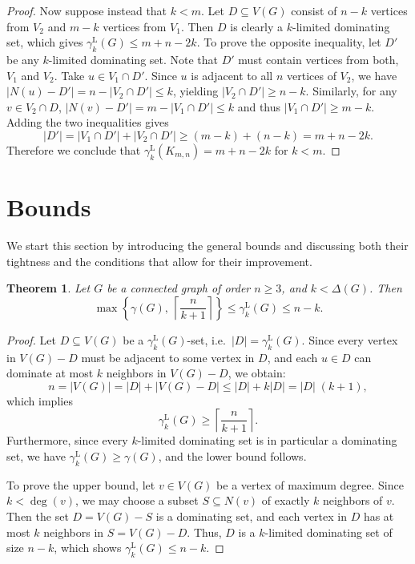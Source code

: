 \documentclass[11pt]{article}
\newtheorem{theorem}{Theorem}
\newcommand{\gammakL}{\gamma_k^{\mathrm L}}
\begin{document}
\begin{proof}
Now suppose instead that $k < m$. Let $D \subseteq V(G)$ consist of $n-k$ vertices from $V_2$ and $m-k$ vertices from $V_1$. Then $D$ is clearly a $k$-limited dominating set, which gives $\gammakL(G) \leq  m+n-2k$.
To prove the opposite inequality, let $D'$ be any $k$-limited dominating set. Note that $D'$ must contain vertices from both, $V_1$ and $V_2$.
Take $u\in V_1\cap D'$. Since $u$ is adjacent to all $n$ vertices of $V_2$, we have
$|N(u)-D'|=n-|V_2\cap D'|\leq k$, yielding $|V_2\cap D'|\geq n-k$.
Similarly, for any $v\in V_2\cap D$,
$|N(v)-D'|=m-|V_1\cap D'|\leq k$ and thus $|V_1\cap D'| \geq m-k$. 
Adding the two inequalities gives
$$|D'|=|V_1\cap D'|+|V_2\cap D'| \geq (m-k)+(n-k)=m+n-2k.$$
Therefore we conclude that $\gamma_k^{\mathrm L}(K_{m,n})=m+n-2k$ for $k<m$.
\end{proof}






\section{Bounds}

We start this section by introducing the general bounds and discussing both their tightness and the conditions that allow for their improvement.

\begin{theorem} 
\label{bounds}
Let $G$ be a connected graph of order $n\geq 3$, and $k < \Delta(G)$. Then
$$
\max\left\{\gamma(G),\ \left\lceil \frac{n}{k+1} \right\rceil\right\} 
\leq \gammakL(G)  \leq 
n-k.
$$
\end{theorem}

\begin{proof}
Let $D \subseteq V(G)$ be a $\gammakL(G)$-set, i.e.~$|D| = \gammakL(G)$. Since every vertex in $V(G) - D$ must be adjacent to some vertex in $D$, and each $u \in D$ can dominate at most $k$ neighbors in $V(G) - D$, we obtain:
$$
n = |V(G)| = |D| + |V(G) - D| \leq |D| + k|D| = |D|\;(k+1),
$$
which implies
$$
\gammakL(G) \geq \left\lceil \frac{n}{k+1} \right\rceil.
$$
Furthermore, since every $k$-limited dominating set is in particular a dominating set, we have $\gammakL(G) \geq \gamma(G)$, and the lower bound follows.

To prove the upper bound, let $v \in V(G)$ be a vertex of maximum degree. Since $k < \deg(v)$, we may choose a subset $S \subseteq N(v)$ of exactly $k$ neighbors of $v$. Then the set $D= V(G)-S$ is a dominating set, and each vertex in $D$ has at most $k$ neighbors in $S=V(G)-D$.
Thus, $D$ is a $k$-limited dominating set of size $n - k$, which shows $\gammakL(G) \leq n - k$.
\end{proof}
\end{document}
